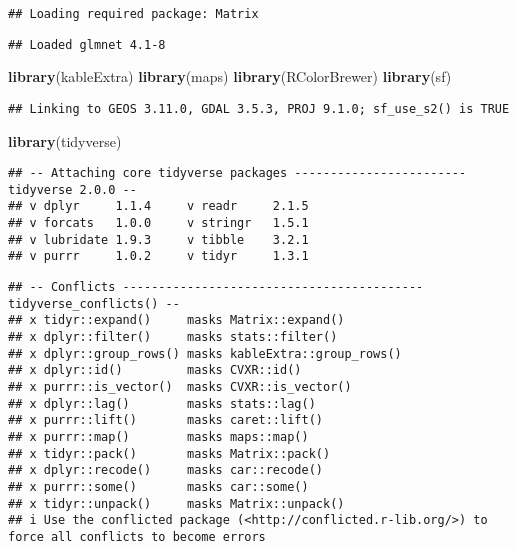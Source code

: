 \documentclass[
]{article}
\newenvironment{Shaded}{\begin{snugshade}}{\end{snugshade}}
\newcommand{\FunctionTok}[1]{\textcolor[rgb]{0.13,0.29,0.53}{\textbf{#1}}}
\newcommand{\NormalTok}[1]{#1}
\begin{document}
\begin{verbatim}
## Loading required package: Matrix
\end{verbatim}

\begin{verbatim}
## Loaded glmnet 4.1-8
\end{verbatim}

\begin{Shaded}
\begin{Highlighting}[]
\FunctionTok{library}\NormalTok{(kableExtra)}
\FunctionTok{library}\NormalTok{(maps)}
\FunctionTok{library}\NormalTok{(RColorBrewer)}
\FunctionTok{library}\NormalTok{(sf)}
\end{Highlighting}
\end{Shaded}

\begin{verbatim}
## Linking to GEOS 3.11.0, GDAL 3.5.3, PROJ 9.1.0; sf_use_s2() is TRUE
\end{verbatim}

\begin{Shaded}
\begin{Highlighting}[]
\FunctionTok{library}\NormalTok{(tidyverse)}
\end{Highlighting}
\end{Shaded}

\begin{verbatim}
## -- Attaching core tidyverse packages ------------------------ tidyverse 2.0.0 --
## v dplyr     1.1.4     v readr     2.1.5
## v forcats   1.0.0     v stringr   1.5.1
## v lubridate 1.9.3     v tibble    3.2.1
## v purrr     1.0.2     v tidyr     1.3.1
\end{verbatim}

\begin{verbatim}
## -- Conflicts ------------------------------------------ tidyverse_conflicts() --
## x tidyr::expand()     masks Matrix::expand()
## x dplyr::filter()     masks stats::filter()
## x dplyr::group_rows() masks kableExtra::group_rows()
## x dplyr::id()         masks CVXR::id()
## x purrr::is_vector()  masks CVXR::is_vector()
## x dplyr::lag()        masks stats::lag()
## x purrr::lift()       masks caret::lift()
## x purrr::map()        masks maps::map()
## x tidyr::pack()       masks Matrix::pack()
## x dplyr::recode()     masks car::recode()
## x purrr::some()       masks car::some()
## x tidyr::unpack()     masks Matrix::unpack()
## i Use the conflicted package (<http://conflicted.r-lib.org/>) to force all conflicts to become errors
\end{verbatim}
\end{document}
